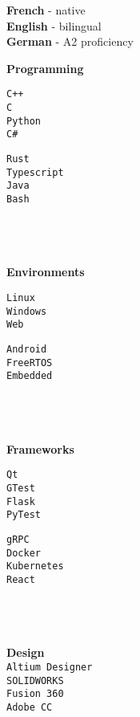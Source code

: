 \documentclass[9pt]{developercv} %
\begin{document}
\begin{minipage}[t]{0.02\textwidth}
	\hfill
\end{minipage}
\begin{minipage}[t]{0.18\textwidth}
		\textbf{French} - native\\
		\textbf{English} - bilingual\\
		\textbf{German} - A2 proficiency

		\textbf{Programming}\\
		\begin{minipage}[t]{0.5\textwidth}
			\texttt{C++}\\
			\texttt{C}\\
			\texttt{Python}\\
			\texttt{C\#}
		\end{minipage}
		\begin{minipage}[t]{0.48\textwidth}
			\texttt{Rust}\\
			\texttt{Typescript}\\
			\texttt{Java}\\
			\texttt{Bash}
		\end{minipage}
		\\\\\\
		\textbf{Environments}\\
		\begin{minipage}[t]{0.5\textwidth}
			\texttt{Linux}\\
			\texttt{Windows}\\
			\texttt{Web}
		\end{minipage}
		\begin{minipage}[t]{0.48\textwidth}
			\texttt{Android}\\
			\texttt{FreeRTOS}\\
			\texttt{Embedded}
		\end{minipage}
		\\\\\\
		\textbf{Frameworks}\\
		\begin{minipage}[t]{0.5\textwidth}
			\texttt{Qt}\\
			\texttt{GTest}\\
			\texttt{Flask}\\
			\texttt{PyTest}
		\end{minipage}
		\begin{minipage}[t]{0.48\textwidth}
			\texttt{gRPC}\\
			\texttt{Docker}\\
			\texttt{Kubernetes}\\
			\texttt{React}
		\end{minipage}
		\\\\\\
		\textbf{Design}\\
		\texttt{Altium Designer}\\
		\texttt{SOLIDWORKS}\\
		\texttt{Fusion 360}\\
		\texttt{Adobe CC}


\end{minipage}
\end{document}
